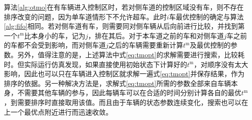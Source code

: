 \begin{remark}
算法\eqref{alg:otmo}在有车辆进入控制区时，若对侧车道的控制区域没有车，则不存在排序改变的问题，因为单车道情形下不允许超车。此时$i$车最优控制的确定与算法\eqref{alg:fifo}相同。若对侧车道有车，则需要同对侧车辆从后向前进行比较，并找到第一个$t^\mathrm{m}$比本身小的车，记为$j$，排在其后。对于本车道之前的车和对侧车道$j$车之前的车都不会受到影响，而对侧车道$j$之后的车辆需要重新计算$t^\mathrm{m}$及最优控制的参数。另外，值得注意的是，上述算法中式\eqref{eq:tmopt}的求解需要进行搜索，比较耗时。但实际运行仿真发现，如果直接使用初始状态下计算好的$t^\mathrm{m}$，对顺序没有太大影响，因此也可以只在车辆进入控制区就求解一遍式\eqref{eq:tmopt}并保存结果，作为排序的依据。另一种解决方法是，求解式\eqref{eq:tmopt}所需的参数全部来自车辆本身，不需要其他车辆的参与，因此每辆车可以在合适的时间分别计算各自的最优$t^\mathrm{m}$，到需要排序时直接取用该值。而且由于车辆的状态参数连续变化，搜索也可以在上一个最优点附近进行而迅速收敛。
\end{remark}
